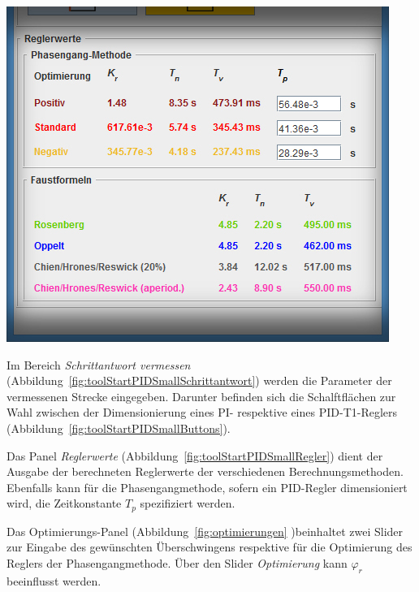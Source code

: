\begin{minipage}[t][][b]{0.45\textwidth}
    \begin{minipage}[c][][b]{\textwidth}
        \centering
        \includegraphics[width=\textwidth]{images/toolStartPIDSmallRegler.jpg}
        \label{fig:toolStartPIDSmallRegler}
    \end{minipage}

\end{minipage}

Im             Bereich             \emph{Schrittantwort             vermessen}
(Abbildung~\ref{fig:toolStartPIDSmallSchrittantwort}) werden die Parameter der
vermessenen  Strecke eingegeben. Darunter  befinden sich  die Schalftfl\"achen
zur   Wahl   zwischen  der   Dimensionierung   eines   PI-  respektive   eines
PID-T1-Reglers (Abbildung~\ref{fig:toolStartPIDSmallButtons}).

Das  Panel   \emph{Reglerwerte}  (Abbildung~\ref{fig:toolStartPIDSmallRegler})
dient   der   Ausgabe   der    berechneten   Reglerwerte   der   verschiedenen
Berechnungsmethoden. Ebenfalls  kann f\"ur  die Phasengangmethode,  sofern ein
PID-Regler dimensioniert wird, die  Zeitkonstante $T_p$ spezifiziert werden.

Das  Optimierungs-Panel  (Abbildung~\ref{fig:optimierungen}  )beinhaltet  zwei
Slider  zur  Eingabe  des   gew\"unschten  \"Uberschwingens  respektive  f\"ur
die  Optimierung   des  Reglers  der  Phasengangmethode. \"Uber   den  Slider
\emph{Optimierung} kann $\varphi_r$ beeinflusst werden.

